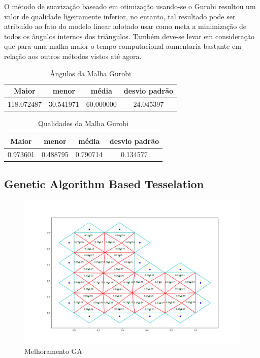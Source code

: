O método de suavização baseado em otimização usando-se o Gurobi resultou um valor de qualidade ligeiramente inferior, no entanto, tal resultado pode ser atribuído ao fato do modelo linear adotado usar como meta a minimização de todos os ângulos internos dos triângulos. Também deve-se levar em consideração que para uma malha maior o tempo computacional aumentaria bastante em relação aos outros métodos vistos até agora.

\begin{table}[hb]
\centering
\par\caption{Ângulos da Malha Gurobi}
\begin{tabular}{c|c|c|c}
Maior&menor&média&desvio padrão\\\hline\hline
118.072487&30.541971&60.000000&24.045397\\\hline
\end{tabular}
\label{tab:angulos-malha-gurobi}
\end{table}

\begin{table}[hb]
\centering
\par\caption{Qualidades da Malha Gurobi}
\begin{tabular}{c|c|c|c}
Maior&menor&média&desvio padrão\\\hline\hline
0.973601&0.488795&0.790714&0.134577\\\hline
\end{tabular}
\label{tab:qualidades-malha-gurobi}
\end{table}

\newpage
\subsection{Genetic Algorithm Based Tesselation}

\begin{figure}[ht]
    \centering
    \includegraphics[width=1\linewidth]{fig/malha-ga.png}
    \caption{Melhoramento GA}
    \label{fig:malha-ga}
\end{figure}

